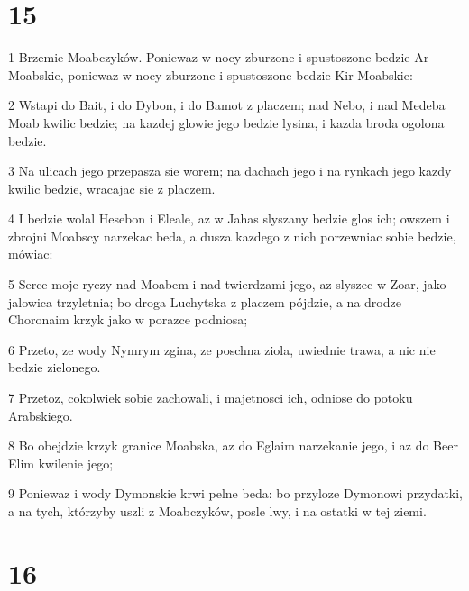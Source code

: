 \chapter{15}

\par 1 Brzemie Moabczyków. Poniewaz w nocy zburzone i spustoszone bedzie Ar Moabskie, poniewaz w nocy zburzone i spustoszone bedzie Kir Moabskie:
\par 2 Wstapi do Bait, i do Dybon, i do Bamot z placzem; nad Nebo, i nad Medeba Moab kwilic bedzie; na kazdej glowie jego bedzie lysina, i kazda broda ogolona bedzie.
\par 3 Na ulicach jego przepasza sie worem; na dachach jego i na rynkach jego kazdy kwilic bedzie, wracajac sie z placzem.
\par 4 I bedzie wolal Hesebon i Eleale, az w Jahas slyszany bedzie glos ich; owszem i zbrojni Moabscy narzekac beda, a dusza kazdego z nich porzewniac sobie bedzie, mówiac:
\par 5 Serce moje ryczy nad Moabem i nad twierdzami jego, az slyszec w Zoar, jako jalowica trzyletnia; bo droga Luchytska z placzem pójdzie, a na drodze Choronaim krzyk jako w porazce podniosa;
\par 6 Przeto, ze wody Nymrym zgina, ze poschna ziola, uwiednie trawa, a nic nie bedzie zielonego.
\par 7 Przetoz, cokolwiek sobie zachowali, i majetnosci ich, odniose do potoku Arabskiego.
\par 8 Bo obejdzie krzyk granice Moabska, az do Eglaim narzekanie jego, i az do Beer Elim kwilenie jego;
\par 9 Poniewaz i wody Dymonskie krwi pelne beda: bo przyloze Dymonowi przydatki, a na tych, którzyby uszli z Moabczyków, posle lwy, i na ostatki w tej ziemi.

\chapter{16}

